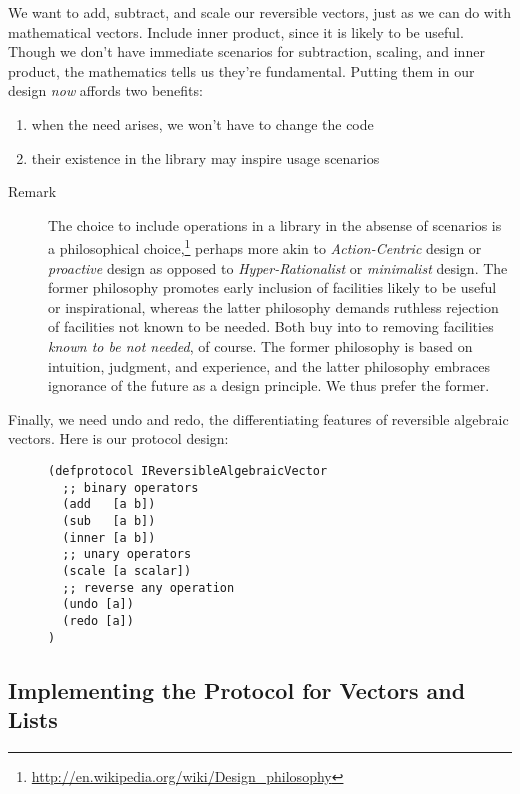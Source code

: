 \documentclass[11pt]{article}
\begin{document}
We want to add, subtract, and scale our reversible vectors, just as we
can do with mathematical vectors.  Include inner product, since it is
likely to be useful.  Though we don't have immediate scenarios for
subtraction, scaling, and inner product, the mathematics tells us
they're fundamental. Putting them in our design \emph{now} affords two
benefits:
\begin{enumerate}
\item when the need arises, we won't have to change the code
\item their existence in the library may inspire usage scenarios
\end{enumerate}



\begin{description}
\item[{Remark}] The choice to include operations in a library in the absense
of scenarios is a philosophical
choice,\footnote{\url{http://en.wikipedia.org/wiki/Design_philosophy}}
perhaps more akin to \emph{Action-Centric} design or \emph{proactive}
design as opposed to \emph{Hyper-Rationalist} or \emph{minimalist}
design. The former philosophy promotes early inclusion of
facilities likely to be useful or inspirational, whereas the
latter philosophy demands ruthless rejection of facilities
not known to be needed. Both buy into to removing facilities
\emph{known to be not needed}, of course. The former philosophy
is based on intuition, judgment, and experience, and the
latter philosophy embraces ignorance of the future as a
design principle. We thus prefer the former.
\end{description}



Finally, we need undo and redo, the differentiating features of
reversible algebraic vectors. Here is our protocol design:

\begin{figure}[H]
\label{reversible-algebraic-vector-protocol}
\begin{verbatim}
(defprotocol IReversibleAlgebraicVector
  ;; binary operators
  (add   [a b])
  (sub   [a b])
  (inner [a b])
  ;; unary operators
  (scale [a scalar])
  ;; reverse any operation
  (undo [a])
  (redo [a])
)
\end{verbatim}
\end{figure}

\subsection{Implementing the Protocol for Vectors and Lists}
\label{sec-3-1}
\end{document}
